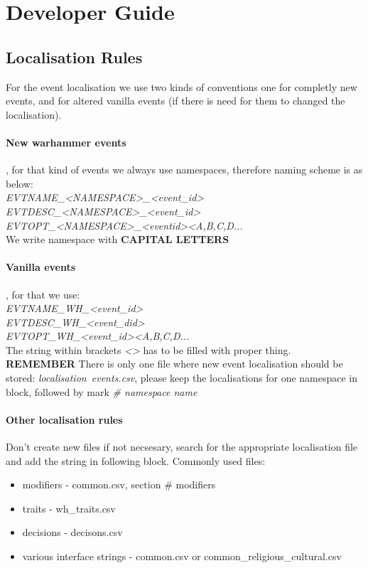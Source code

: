 \documentclass[10pt, english]{article}
\author{Piotr<elminister@interia.pl>}
\begin{document}
\section{Developer Guide}
\subsection{Localisation Rules}
For the event localisation we use two kinds of conventions one for
completly new events, and for altered vanilla events (if there is need for them
to changed the localisation).
\paragraph{New warhammer events},
for that kind of events we always use namespaces, therefore 
naming scheme is as below: \\
\textit{EVTNAME\_<NAMESPACE>\_<event\_id>}
\\
\textit{EVTDESC\_<NAMESPACE>\_<event\_id>}
\\
\textit{EVTOPT\_<NAMESPACE>\_<eventid><A,B,C,D...}\\
We write namespace with \textbf{CAPITAL LETTERS}

\paragraph{Vanilla events}, for that we use:\\
\textit{EVTNAME\_WH\_<event\_id>}
\\
\textit{EVTDESC\_WH\_<event\_did>}
\\
\textit{EVTOPT\_WH\_<event\_id><A,B,C,D...}\\
The string within brackets \textit{<>} has to be filled with proper thing.\\
\textbf{REMEMBER}
There is only one file where new event localisation should be stored:
\textit{localisation\ events.csv}, please keep the localisations for
one namespace in block, followed by mark \textit{\# namespace name}
\\
\paragraph{Other localisation rules}
Don't create new files if not necsesary, search for the appropriate localisation file
and add the string in following block.
Commonly used files:
\begin{itemize}
\item modifiers - common.csv, section \# modifiers
\item traits - wh\_traits.csv
\item decisions - decisons.csv
\item various interface strings - common.csv or common\_religious\_cultural.csv
\end{itemize}
\end{document}
